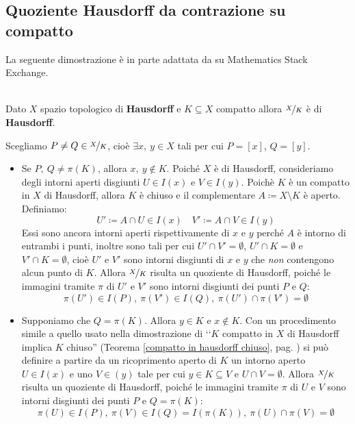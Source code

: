 \subsection{Quoziente Hausdorff da contrazione su compatto}
La seguente dimostrazione è in parte adattata da \cite{user:hausdorff} su Mathematics Stack Exchange.
\begin{lemming}~{}\\
	Dato $X$ spazio topologico di \textbf{Hausdorff} e $K\subseteq X$ compatto allora $\nicefrac{X}{K}$ è di \textbf{Hausdorff}.
\end{lemming}
\begin{demonstration}
	Scegliamo $P\neq Q\in \nicefrac{X}{K}$, cioè $\exists x,\ y\in X$ tali per cui $P=[x]$, $Q=[y]$.
	\begin{itemize}
		\item Se $P,\ Q\neq \pi\left(K\right)$, allora $x,\ y\notin K$. Poiché $X$ è di Hausdorff, consideriamo degli intorni aperti disgiunti $U\in I\left(x\right)$ e $V\in I\left(y\right)$. Poichè $K$ è un compatto in $X$ di Hausdorff, allora $K$ è chiuso e il complementare $A\coloneqq X\setminus K$ è aperto. Definiamo:
		\begin{equation*}
			U'\coloneqq A\cap U\in I\left(x\right)\quad V'\coloneqq A\cap V\in I\left(y\right)
		\end{equation*}
		Essi sono ancora intorni aperti rispettivamente di $x$ e $y$ perché $A$ è intorno di entrambi i punti, inoltre sono tali per cui $U'\cap V'=\emptyset$, $U'\cap K=\emptyset$ e $V'\cap K=\emptyset$, cioè $U'$ e $V'$ sono intorni disgiunti di $x$ e $y$ che \textit{non} contengono alcun punto di $K$. Allora $\nicefrac{X}{K}$ risulta un quoziente di Hausdorff, poiché le immagini tramite $\pi$ di $U'$ e $V'$ sono intorni disgiunti dei punti $P$ e $Q$:
		\begin{equation*}
			\pi\left(U'\right)\in I\left(P\right),\ \pi\left(V'\right)\in I\left(Q\right),\ \pi\left(U'\right)\cap \pi\left(V'\right)=\emptyset
		\end{equation*}
		\item Supponiamo che $Q=\pi\left(K\right)$. Allora $y\in K$ e $x\notin K$. Con un procedimento simile a quello usato nella dimostrazione di ‘‘$K$ compatto in $X$ di Hausdorff implica $K$ chiuso'' (Teorema \ref{compatto in hausdorff chiuso}, pag. \pageref{compatto in hausdorff chiuso}) si può definire a partire da un ricoprimento aperto di $K$ un intorno aperto $U\in I\left(x\right)$ e uno $V\in \left(y\right)$ tale per cui $y\in K\subseteq V$ e $U\cap V=\emptyset$. Allora $\nicefrac{X}{K}$ risulta un quoziente di Hausdorff, poiché le immagini tramite $\pi$ di $U$ e $V$ sono intorni disgiunti dei punti $P$ e $Q=\pi\left(K\right)$:
		\begin{equation*}
			\pi\left(U\right)\in I\left(P\right),\ \pi\left(V\right)\in I\left(Q\right)=I\left(\pi\left(K\right)\right),\ \pi\left(U\right)\cap \pi\left(V\right)=\emptyset
		\end{equation*}
	\end{itemize}
\vspace{-6mm}
\end{demonstration}
\label{quozientehausdorffsuspaziocompatto}
